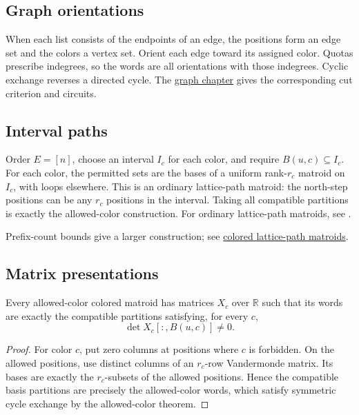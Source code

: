 \subsection[graphOrientations]{Graph orientations}

When each list consists of the endpoints of an edge, the positions form
an edge set and the colors a vertex set. Orient each edge toward its
assigned color. Quotas prescribe indegrees, so the words are all
orientations with those indegrees. Cyclic exchange reverses a directed
cycle. The \href{graphic.htm}{graph chapter} gives the corresponding cut
criterion and circuits.

\subsection[latticePaths]{Interval paths}

Order $E=[n]$, choose an interval $I_c$ for each color, and require
$B(u,c)\subseteq I_c$. For each color, the permitted sets are the bases
of a uniform rank-$r_c$ matroid on $I_c$, with loops elsewhere.
This is an ordinary lattice-path matroid: the north-step positions can
be any $r_c$ positions in the interval. Taking all compatible partitions
is exactly the allowed-color construction. For ordinary lattice-path
matroids, see \cite{BoninMierNoy2003}.

Prefix-count bounds give a larger construction; see
\href{lattice-paths.htm}{colored lattice-path matroids}.

\subsection[matrixPresentations]{Matrix presentations}

\begin{proposition}
Every allowed-color colored matroid has matrices $X_c$ over $\mathbb R$ such
that its words are exactly the compatible partitions satisfying, for every $c$,
\[
 \det X_c[:,B(u,c)]\ne0.
\]
\end{proposition}

\begin{proof}
For color $c$, put zero columns at positions where $c$ is forbidden. On the
allowed positions, use distinct columns of an $r_c$-row Vandermonde matrix.
Its bases are exactly the $r_c$-subsets of the allowed positions. Hence the
compatible basis partitions are precisely the allowed-color words, which
satisfy symmetric cycle exchange by the allowed-color theorem.
\end{proof}

